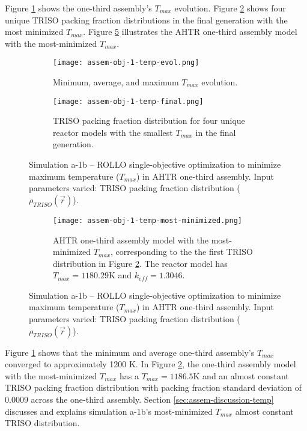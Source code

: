 Figure \ref{fig:assem-obj-1-temp-evol} shows the one-third assembly's $T_{max}$ 
evolution. 
Figure \ref{fig:assem-obj-1-temp-final} shows four unique TRISO packing fraction 
distributions in the final generation with the most minimized $T_{max}$. 
Figure \ref{fig:assem-obj-1-temp-most-minimized} illustrates the \gls{AHTR} one-third 
assembly model with the most-minimized $T_{max}$. 
\begin{figure}[htbp!]
    \begin{subfigure}{\textwidth}
        \centering
        \texttt{[image: assem-obj-1-temp-evol.png]}
        \caption{Minimum, average, and maximum $T_{max}$ evolution.}
        \label{fig:assem-obj-1-temp-evol} 
    \end{subfigure}
    \begin{subfigure}{\textwidth}
        \centering
        \texttt{[image: assem-obj-1-temp-final.png]}
        \caption{TRISO packing fraction distribution for four unique reactor models with the 
        smallest $T_{max}$ in the final generation.}
        \label{fig:assem-obj-1-temp-final} 
    \end{subfigure}
    \caption{Simulation a-1b -- ROLLO single-objective optimization to minimize maximum 
    temperature ($T_{max}$) in \gls{AHTR} one-third assembly. 
    Input parameters varied: \gls{TRISO} packing fraction distribution 
    ($\rho_{TRISO}(\vec{r})$).}
    \label{fig:assem-obj-1-temp}
\end{figure}
\begin{figure}[htbp!]
    \ContinuedFloat
    \begin{subfigure}{\textwidth}
        \centering
        \texttt{[image: assem-obj-1-temp-most-minimized.png]}
        \caption{\gls{AHTR} one-third assembly model with the most-minimized 
        $T_{max}$, corresponding to the the first TRISO distribution in Figure 
        \ref{fig:assem-obj-1-temp-final}. The reactor model has $T_{max}=1180.29$K
        and $k_{eff}=1.3046$.}
        \label{fig:assem-obj-1-temp-most-minimized} 
    \end{subfigure}
    \caption{Simulation a-1b -- ROLLO single-objective optimization to minimize maximum 
    temperature ($T_{max}$) in \gls{AHTR} one-third assembly. 
    Input parameters varied: \gls{TRISO} packing fraction distribution 
    ($\rho_{TRISO}(\vec{r})$).}
\end{figure}

Figure \ref{fig:assem-obj-1-temp-evol} shows that the minimum and average one-third 
assembly's $T_{max}$ converged to approximately 1200 K.
In Figure \ref{fig:assem-obj-1-temp-final}, the one-third assembly model with the 
most-minimized $T_{max}$ has a $T_{max}=1186.5$K and an almost constant TRISO packing 
fraction distribution with packing fraction standard deviation of $0.0009$ across the 
one-third assembly. 
Section \ref{sec:assem-discussion-temp} discusses and explains simulation a-1b's 
most-minimized $T_{max}$ almost constant TRISO distribution. 

